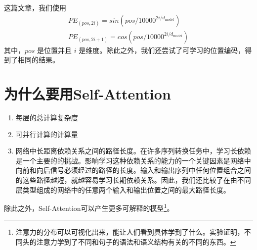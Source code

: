 \documentclass[a4paper,UTF8,no-math]{ctexart}
\newcommand{\dmodel}{d_{\text{model}}}
\begin{document}
	这篇文章，我们使用
	\begin{align*}
	PE_{(pos,2i)} = sin(pos / 10000^{2i/\dmodel}) \\
	PE_{(pos,2i+1)} = cos(pos / 10000^{2i/\dmodel})
	\end{align*}其中，$pos$ 是位置并且 $i$ 是维度。除此之外，我们还尝试了可学习的位置编码，得到了相同的结果。
	
	\section{为什么要用Self-Attention}
	
	\begin{enumerate}
		\item 每层的总计算复杂度
		\item 可并行计算的计算量
		\item 网络中长距离依赖关系之间的路径长度。在许多序列转换任务中，学习长依赖是一个主要的的挑战。影响学习这种依赖关系的能力的一个关键因素是网络中向前和向后信号必须经过的路径的长度。输入和输出序列中任何位置组合之间的这些路径越短，就越容易学习长期依赖关系。因此，我们还比较了在由不同层类型组成的网络中的任意两个输入和输出位置之间的最大路径长度。
	\end{enumerate}
	
	除此之外，Self-Attention可以产生更多可解释的模型\footnote{注意力的分布可以可视化出来，能让人们看到具体学到了什么。实验证明，不同头的注意力学到了不同和句子的语法和语义结构有关的不同的东西。}。
	
\end{document}

